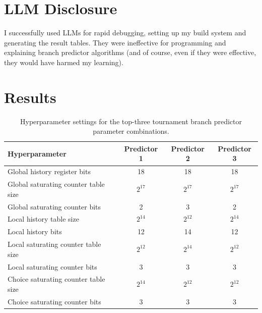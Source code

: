 \documentclass{article}
\begin{document}
\section{LLM Disclosure}

I successfully used LLMs for rapid debugging, setting up my build system and generating the result tables. They were ineffective for programming and explaining 
branch predictor algorithms (and of course, even if they were effective, they would have harmed my learning).

\printbibliography

\newpage
\appendix
\section{Results}

\begin{table}[h]
    \centering
    \begin{tabular}{lccc}
        \toprule
        \textbf{Hyperparameter} & \textbf{Predictor 1} & \textbf{Predictor 2} & \textbf{Predictor 3} \\
        \midrule
        Global history register bits       & 18 & 18 & 18 \\
        Global saturating counter table size & $2^{17}$ & $2^{17}$ & $2^{17}$ \\
        Global saturating counter bits     & 2 & 3 & 2 \\
        Local history table size           & $2^{14}$ & $2^{12}$ & $2^{14}$ \\
        Local history bits                 & 12 & 14 & 12 \\
        Local saturating counter table size & $2^{12}$ & $2^{14}$ & $2^{12}$ \\
        Local saturating counter bits      & 3 & 3 & 3 \\
        Choice saturating counter table size & $2^{14}$ & $2^{12}$ & $2^{12}$ \\
        Choice saturating counter bits     & 3 & 3 & 3 \\
        \bottomrule
    \end{tabular}
    \caption{Hyperparameter settings for the top-three tournament branch predictor parameter combinations.}
    \label{tab:tbp_res_desc}
\end{table}
\end{document}
